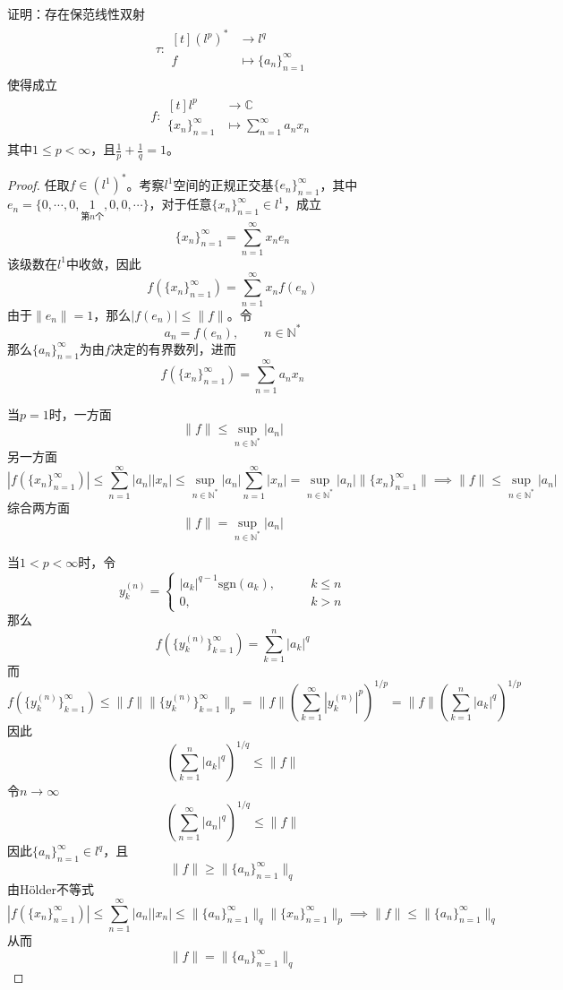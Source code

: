 \documentclass[lang = cn, scheme = chinese]{elegantbook}
\newcommand{\N}{\mathbb{N}}            %
\newcommand{\C}{\mathbb{C}}  		   %
\begin{document}
\chapter{}

\begin{proposition}
	证明：存在保范线性双射
	\begin{align*}
		\tau:\begin{aligned}[t]
			(l^p)^*&\longrightarrow l^q\\
			f&\longmapsto \{a_n\}_{n=1}^{\infty}
		\end{aligned}
	\end{align*}
	使得成立
	\begin{align*}
		f:\begin{aligned}[t]
			l^p&\longrightarrow \C\\
			\{x_n\}_{n=1}^{\infty}&\longmapsto \sum_{n=1}^{\infty}a_nx_n
		\end{aligned}
	\end{align*}
	其中$1\le p<\infty$，且$\frac{1}{p}+\frac{1}{q}=1$。
\end{proposition}

\begin{proof}
	任取$f\in (l^1)^*$。考察$l^1$空间的正规正交基$\{e_n\}_{n=1}^{\infty}$，其中$e_n=\{0,\cdots,0,\underset{\text{第}n\text{个}}{1},0,0,\cdots\}$，对于任意$\{x_n\}_{n=1}^{\infty}\in l^1$，成立
	$$
	\{x_n\}_{n=1}^{\infty}=\sum_{n=1}^{\infty}x_ne_n
	$$
	该级数在$l^1$中收敛，因此
	$$
	f(\{x_n\}_{n=1}^{\infty})=\sum_{n=1}^{\infty}x_nf(e_n)
	$$
	由于$\|e_n\|=1$，那么$|f(e_n)|\le \|f\|$。令
	$$
	a_n=f(e_n),\qquad n\in\N^*
	$$
	那么$\{a_n\}_{n=1}^{\infty}$为由$f$决定的有界数列，进而
	$$
	f(\{x_n\}_{n=1}^{\infty})=\sum_{n=1}^{\infty}a_nx_n
	$$
	
	当$p=1$时，一方面
	$$
	\|f\|\le\sup_{n\in\N^*}|a_n|
	$$
	另一方面
	$$
	|f(\{x_n\}_{n=1}^{\infty})|
	\le \sum_{n=1}^{\infty}|a_n||x_n|
	\le \sup_{n\in\N^*}|a_n|\sum_{n=1}^{\infty}|x_n|
	= \sup_{n\in\N^*}|a_n|\| \{x_n\}_{n=1}^{\infty} \|
	\implies 
	\|f\|\le \sup_{n\in\N^*}|a_n|
	$$
	综合两方面
	$$
	\|f\|=\sup_{n\in\N^*}|a_n|
	$$
	
	当$1< p <\infty$时，令
	$$
	y_{k}^{(n)}=\begin{cases}
		|a_k|^{q-1}\text{sgn}(a_k),\qquad & k\le n\\
		0,\qquad & k>n
	\end{cases}
	$$
	那么
	$$
	f(\{y_k^{(n)}\}_{k=1}^{\infty})=\sum_{k=1}^{n}|a_k|^q
	$$
	而
	$$
	f(\{y_k^{(n)}\}_{k=1}^{\infty})
	\le \|f\|\| \{y_k^{(n)}\}_{k=1}^{\infty} \|_p
	= \|f\|\left(\sum_{k=1}^{\infty}|y_k^{(n)}|^p\right)^{1/p}
	= \|f\|\left(\sum_{k=1}^{n}|a_k|^q\right)^{1/p}
	$$
	因此
	$$
	\left(\sum_{k=1}^{n}|a_k|^q\right)^{1/q}\le \|f\|
	$$
	令$n\to\infty$
	$$
	\left(\sum_{n=1}^{\infty}|a_n|^q\right)^{1/q}\le \|f\|
	$$
	因此$\{a_n\}_{n=1}^{\infty}\in l^q$，且
	$$
	\|f\|\ge \| \{a_n\}_{n=1}^{\infty} \|_q
	$$
	由Hölder不等式
	$$
	|f(\{x_n\}_{n=1}^{\infty})|
	\le \sum_{n=1}^{\infty}|a_n||x_n|
	\le \|\{a_n\}_{n=1}^{\infty}\|_q \|\{x_n\}_{n=1}^{\infty}\|_p \implies
	\|f\|\le \| \{a_n\}_{n=1}^{\infty} \|_q
	$$
	从而
	$$
	\|f\|=\| \{a_n\}_{n=1}^{\infty} \|_q
	$$
\end{proof}
	
\end{document}
